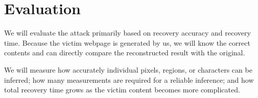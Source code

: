 \section{Evaluation}
\label{sec:evaluation}

We will evaluate the attack primarily based on recovery accuracy and recovery time. Because the victim webpage is generated by us, we will know the correct contents and can directly compare the reconstructed result with the original.

We will measure how accurately individual pixels, regions, or characters can be inferred; how many measurements are required for a reliable inference; and how total recovery time grows as the victim content becomes more complicated.
